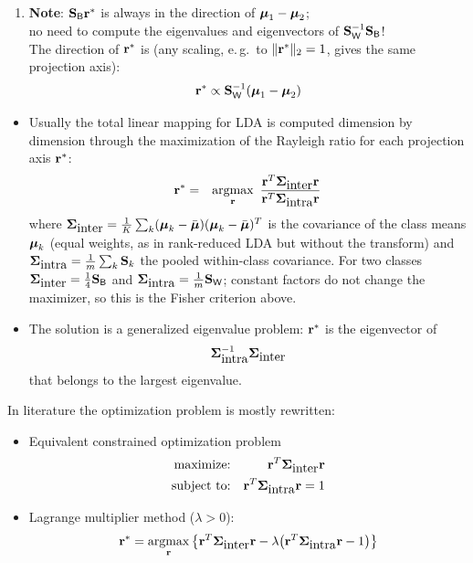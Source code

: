 \begin{enumerate}
{\begin{eqnarray*}
		      \end{eqnarray*}
		      }
		\item \textbf{Note}: $\mathbf{S}_\mathsf{B} \bm{\mathrm{r}}^*$ is always in the direction of $\bm{\mathrm{\mu}}_1 - \bm{\mathrm{\mu}}_2$; \\
		      no need to compute the eigenvalues and eigenvectors of $\mathbf{S}_\mathsf{W}^{-1} \mathbf{S}_\mathsf{B}$! \\
		      The direction of $\bm{\mathrm{r}}^*$ is (any scaling, e.\,g.\ to $\|\bm{\mathrm{r}}^*\|_2=1$, gives the same projection axis):
		      {\small
		      \begin{displaymath}
			      \bm{\mathrm{r}}^* \propto \mathbf{S}_\mathsf{W}^{-1} (\bm{\mathrm{\mu}}_1 - \bm{\mathrm{\mu}}_2)
		      \end{displaymath}
		      }	      
	\end{enumerate}
	
	\begin{itemize}
		\item Usually the total linear mapping for LDA is computed dimension by dimension through the maximization of the Rayleigh ratio for each projection axis $\bm{\mathrm{r}}^*$:
		      \begin{eqnarray*}
			      \bm{\mathrm{r}}^* &=& \operatorname*{argmax}_{\bm{\mathrm{r}}}\ \frac{\bm{\mathrm{r}}^T \mathbf{\Sigma}_{\mbox{inter}} \bm{\mathrm{r}}}{\bm{\mathrm{r}}^T \mathbf{\Sigma}_{\mbox{intra}} \bm{\mathrm{r}}}
		      \end{eqnarray*}
		      where $\mathbf{\Sigma}_{\mbox{inter}}=\frac1K\sum_k(\bm{\mathrm{\mu}}_k-\bar{\bm{\mathrm{\mu}}})(\bm{\mathrm{\mu}}_k-\bar{\bm{\mathrm{\mu}}})^T$ is the covariance of the class means $\bm{\mathrm{\mu}}_k$ (equal weights, as in rank-reduced LDA but without the transform) and $\mathbf{\Sigma}_{\mbox{intra}}=\frac1m\sum_k\mathbf{S}_k$ the pooled within-class covariance. For two classes $\mathbf{\Sigma}_{\mbox{inter}}=\frac14\mathbf{S}_\mathsf B$ and $\mathbf{\Sigma}_{\mbox{intra}}=\frac1m\mathbf{S}_\mathsf W$; constant factors do not change the maximizer, so this is the Fisher criterion above.
		\item The solution is a generalized eigenvalue problem: $\bm{\mathrm{r}}^*$ is the eigenvector of
		      $$\mathbf{\Sigma}_{\mbox{intra}} ^{-1} \mathbf{\Sigma}_{\mbox{inter}}$$
		      that belongs to the largest eigenvalue.
	\end{itemize}
	In literature the optimization problem is mostly rewritten:
		\begin{itemize}
		\item Equivalent constrained optimization problem
		      \begin{eqnarray*}
			      \mbox{maximize:}   & & \bm{\mathrm{r}}^T \mathbf{\Sigma}_{\mbox{inter}}\bm{\mathrm{r}}\\
			      \mbox{subject to:} & & \bm{\mathrm{r}}^T \mathbf{\Sigma}_{\mbox{intra}} \bm{\mathrm{r}} =1
		      \end{eqnarray*}
		\item Lagrange multiplier method ($\lambda>0$):
		      \begin{displaymath}
			      \bm{\mathrm{r}}^* = \operatorname*{argmax}_{\bm{\mathrm{r}}}
			      \left\{
			      \bm{\mathrm{r}}^T \mathbf{\Sigma}_{\mbox{inter}} \bm{\mathrm{r}}
			      - \lambda\big(\bm{\mathrm{r}}^T \mathbf{\Sigma}_{\mbox{intra}} \bm{\mathrm{r}} - 1\big)
			      \right\}
		      \end{displaymath}
	\end{itemize}


